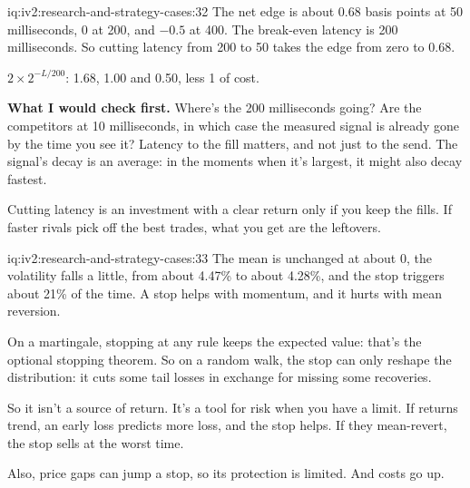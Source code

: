 \begin{solution}{iq:iv2:research-and-strategy-cases:32}
The net edge is about 0.68 basis points at 50 milliseconds, 0 at 200, and $-0.5$ at 400. The break-even latency is 200 milliseconds. So cutting latency from 200 to 50 takes the edge from zero to 0.68.

$2 \times 2^{-L/200}$: 1.68, 1.00 and 0.50, less 1 of cost.

\textbf{What I would check first.} Where's the 200 milliseconds going? Are the competitors at 10 milliseconds, in which case the measured signal is already gone by the time you see it? Latency to the fill matters, and not just to the send. The signal's decay is an average: in the moments when it's largest, it might also decay fastest.

Cutting latency is an investment with a clear return only if you keep the fills. If faster rivals pick off the best trades, what you get are the leftovers.

\end{solution}

\begin{solution}{iq:iv2:research-and-strategy-cases:33}
The mean is unchanged at about 0, the volatility falls a little, from about 4.47\% to about 4.28\%, and the stop triggers about 21\% of the time. A stop helps with momentum, and it hurts with mean reversion.

On a martingale, stopping at any rule keeps the expected value: that's the optional stopping theorem. So on a random walk, the stop can only reshape the distribution: it cuts some tail losses in exchange for missing some recoveries.

So it isn't a source of return. It's a tool for risk when you have a limit. If returns trend, an early loss predicts more loss, and the stop helps. If they mean-revert, the stop sells at the worst time.

Also, price gaps can jump a stop, so its protection is limited. And costs go up.

\end{solution}

